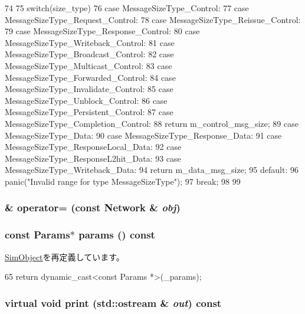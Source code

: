 \begin{DoxyCode}
74 {
75     switch(size_type) {
76       case MessageSizeType_Control:
77       case MessageSizeType_Request_Control:
78       case MessageSizeType_Reissue_Control:
79       case MessageSizeType_Response_Control:
80       case MessageSizeType_Writeback_Control:
81       case MessageSizeType_Broadcast_Control:
82       case MessageSizeType_Multicast_Control:
83       case MessageSizeType_Forwarded_Control:
84       case MessageSizeType_Invalidate_Control:
85       case MessageSizeType_Unblock_Control:
86       case MessageSizeType_Persistent_Control:
87       case MessageSizeType_Completion_Control:
88         return m_control_msg_size;
89       case MessageSizeType_Data:
90       case MessageSizeType_Response_Data:
91       case MessageSizeType_ResponseLocal_Data:
92       case MessageSizeType_ResponseL2hit_Data:
93       case MessageSizeType_Writeback_Data:
94         return m_data_msg_size;
95       default:
96         panic("Invalid range for type MessageSizeType");
97         break;
98     }
99 }
\end{DoxyCode}
\hypertarget{classNetwork_a904d771fc938af1e3c0cafaa20d13923}{
\subsubsection[{operator=}]{\& operator= (const {\bf Network} \& {\em obj})}}
\label{classNetwork_a904d771fc938af1e3c0cafaa20d13923}
\hypertarget{classNetwork_acd3c3feb78ae7a8f88fe0f110a718dff}{
\subsubsection[{params}]{\setlength{\rightskip}{0pt plus 5cm}const {\bf Params}$\ast$ params () const}}
\label{classNetwork_acd3c3feb78ae7a8f88fe0f110a718dff}


\hyperlink{classSimObject_acd3c3feb78ae7a8f88fe0f110a718dff}{SimObject}を再定義しています。


\begin{DoxyCode}
65     { return dynamic_cast<const Params *>(_params);}
\end{DoxyCode}
\hypertarget{classNetwork_a3ea5f7af5db62cc24f4e40df9ea5c971}{
\subsubsection[{print}]{\setlength{\rightskip}{0pt plus 5cm}virtual void print (std::ostream \& {\em out}) const}}
\label{classNetwork_a3ea5f7af5db62cc24f4e40df9ea5c971}


